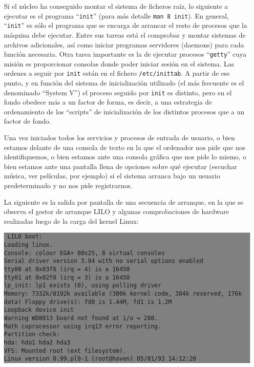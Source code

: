 \documentclass[12pt]{article}
\begin{document}
Si el núcleo ha conseguido montar el sistema de ficheros raíz, lo siguiente a
ejecutar es el programa ``\texttt{init}'' (para más detalle \texttt{man 8 init}). 
En general, ``\texttt{init}'' es sólo el programa que se encarga de arrancar el resto de
procesos que la máquina debe ejecutar. Entre sus tareas está el comprobar y
montar sistemas de archivos adicionales, así como iniciar programas servidores (daemons)
para cada función necesaria. Otra tarea importante es la de ejecutar procesos
``\texttt{getty}'' cuya misión es proporcionar consolas donde poder iniciar sesión en el
sistema. Las ordenes a seguir por \texttt{init} están en el fichero \texttt{/etc/inittab}. 
A partir de
ese punto, y en función del sistema de inicialización utilizado (el más frecuente es
el denominado ``System V'') el proceso seguido por \texttt{init} es distinto, pero en el
fondo obedece más a un factor de forma, es decir, a una estrategia de
ordenamiento de los ``scripts'' de inicialización de los distintos procesos que a un
factor de fondo.

Una vez iniciados todos los servicios y procesos de entrada de usuario, o bien
estamos delante de una consola de texto en la que el ordenador nos pide que nos
identifiquemos, o bien estamos ante una consola gráfica que nos pide lo mismo, o
bien estamos ante una pantalla llena de opciones sobre qué ejecutar (escuchar
música, ver películas, por ejemplo) si el sistema arranca bajo un usuario
predeterminado y no nos pide registrarnos.

La siguiente es la salida por pantalla de una secuencia de arranque, en 
la que se observa el gestor de arranque LILO y algunas comprobaciones de 
hardware realizadas luego de la carga del kernel Linux: 

\colorbox{grey}{\parbox[t]{0.95\linewidth}{ \vspace*{0.5cm} {\tt 
LILO boot: \\
Loading linux. \\
Console: colour EGA+ 80x25, 8 virtual consoles \\
Serial driver version 3.94 with no serial options enabled \\
tty00 at 0x03f8 (irq = 4) is a 16450 \\
tty01 at 0x02f8 (irq = 3) is a 16450 \\
lp\_init: lp1 exists (0), using polling driver \\
Memory: 7332k/8192k available (300k kernel code, 384k reserved, 176k \\
data)
Floppy drive(s): fd0 is 1.44M, fd1 is 1.2M \\
Loopback device init \\
Warning WD8013 board not found at i/o = 280. \\
Math coprocessor using irq13 error reporting. \\
Partition check: \\
  hda: hda1 hda2 hda3 \\
VFS: Mounted root (ext filesystem). \\
Linux version 0.99.pl9-1 (root@haven) 05/01/93 14:12:20
 } \vspace*{0.5cm} } } 
\end{document}
